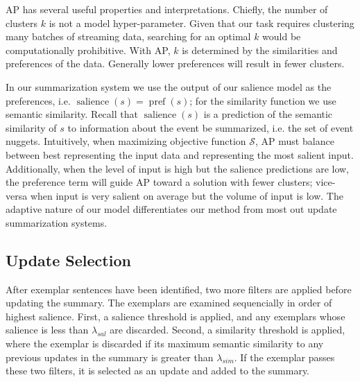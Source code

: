 AP has several useful properties and interpretations. Chiefly, the number
of clusters $k$ is not a model hyper-parameter. Given that our task requires
clustering many batches of streaming data, searching for an optimal $k$ 
would be computationally prohibitive. With AP, $k$ is determined by the
similarities and preferences of the data. Generally lower preferences will
result in fewer clusters.  


In our summarization system we use the output of our salience model as 
the preferences, i.e.
$\operatorname{salience}(s) = \operatorname{pref}(s)$; for the similarity 
function we use semantic similarity. Recall that $\operatorname{salience}(s)$
is a prediction of the semantic similarity of $s$ to information about the 
event be summarized, i.e. the set of event nuggets.
Intuitively, when maximizing objective function $\mathcal{S}$, AP must balance
between best representing the input data and representing the most salient
input. Additionally, when the level of input is high but the salience
predictions are low, the preference term will guide AP toward a solution
with fewer clusters; vice-versa when input is very salient on average but
the volume of input is low. The adaptive nature of our model differentiates
our method from most out update summarization systems.




\subsection{Update Selection}
\label{sec:upsel}

After exemplar sentences have been identified, two more filters are applied 
before updating the summary. The exemplars are examined
sequencially in order of highest salience. First, a salience threshold 
is applied, and any exemplars whose salience is less than
$\lambda_{sal}$ are discarded. Second, a similarity threshold 
is applied, where the exemplar is discarded if its
maximum semantic similarity to any previous updates in the summary is
greater than $\lambda_{sim}$. If the exemplar passes these two filters,
it is selected as an update and added to the summary.




